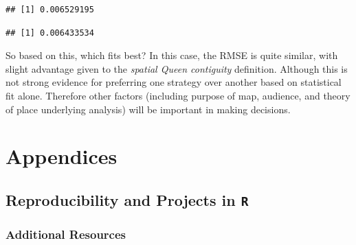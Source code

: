 \documentclass[
]{book}
\newenvironment{Shaded}{\begin{snugshade}}{\end{snugshade}}
\newcommand{\FunctionTok}[1]{\textcolor[rgb]{0.00,0.00,0.00}{#1}}
\newcommand{\NormalTok}[1]{#1}
\newcommand{\SpecialCharTok}[1]{\textcolor[rgb]{0.00,0.00,0.00}{#1}}
\begin{document}
\begin{verbatim}
## [1] 0.006529195
\end{verbatim}

\begin{Shaded}
\end{Shaded}

\begin{verbatim}
## [1] 0.006433534
\end{verbatim}

So based on this, which fits best? In this case, the RMSE is quite similar, with slight advantage given to the \emph{spatial Queen contiguity} definition. Although this is not strong evidence for preferring one strategy over another based on statistical fit alone. Therefore other factors (including purpose of map, audience, and theory of place underlying analysis) will be important in making decisions.

\hypertarget{part-appendices}{%
\part{Appendices}\label{part-appendices}}

\hypertarget{reproducibility-and-projects-in-r}{%
\chapter{\texorpdfstring{Reproducibility and Projects in \texttt{R}}{Reproducibility and Projects in R}}\label{reproducibility-and-projects-in-r}}

\hypertarget{additional-resources-5}{%
\section*{Additional Resources}\label{additional-resources-5}}
\end{document}
